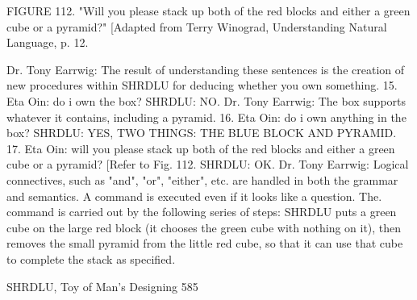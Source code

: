 {FIGURE 112. "Will you please stack up both of the red blocks and either a green cube or
a pyramid?" [Adapted from Terry Winograd, Understanding Natural Language, p. 12.

        Dr. Tony Earrwig: The result of understanding these sentences is the creation of
        new procedures within SHRDLU for deducing whether you own something.
15. Eta Oin: do i own the box?
        SHRDLU: NO.
        Dr. Tony Earrwig: The box supports whatever it contains, including a pyramid.
16. Eta Oin: do i own anything in the box?
        SHRDLU: YES, TWO THINGS: THE BLUE BLOCK AND PYRAMID.
17. Eta Oin: will you please stack up both of the red blocks and either a green cube or a
        pyramid? [Refer to Fig. 112.
        SHRDLU: OK.
        Dr. Tony Earrwig: Logical connectives, such as "and", "or", "either", etc. are
           handled in both the grammar and semantics. A command is executed even if it
           looks like a question. The. command is carried out by the following series of
           steps: SHRDLU puts a green cube on the large red block (it chooses the green
           cube with nothing on it), then removes the small pyramid from the little red
           cube, so that it can use that cube to complete the stack as specified.




SHRDLU, Toy of Man's Designing                                                       585

}
